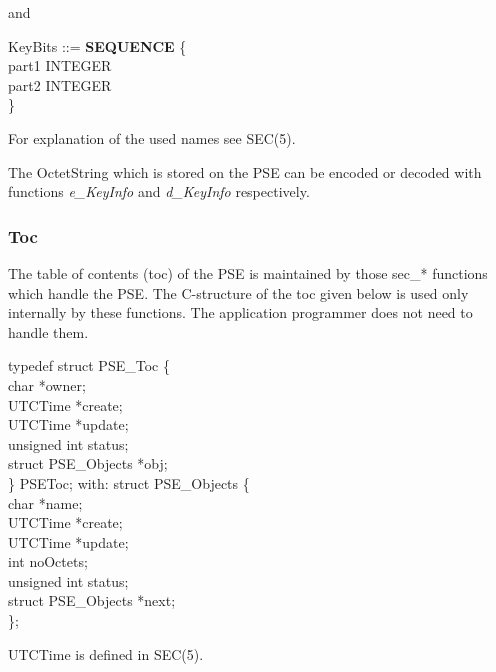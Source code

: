 and

{\small
\bvtab
\1 KeyBits ::= \3 {\bf SEQUENCE} \{ \\
\5                 part1 \2  INTEGER    \\
\5                 part2 \2  INTEGER \\
\4 \}
\evtab
}


For explanation of the used names see SEC(5). 

The OctetString which is stored on the PSE can be encoded or decoded with functions
{\em e\_KeyInfo} and {\em d\_KeyInfo} respectively.

\subsubsection{Toc}
The table of contents (toc) of the PSE is maintained by those sec\_* functions which 
handle the PSE. The C-structure of the toc given below is used only internally by these
functions. The application programmer does not need to handle them.

{\small
\bvtab
\4      typedef struct PSE\_Toc \{ \\
\6              char                \4 *owner; \\
\6              UTCTime             \4 *create; \\
\6              UTCTime             \4 *update; \\
\6		unsigned int        \4  status; \\
\6              struct PSE\_Objects \4 *obj; \\
\4      \} PSEToc;
\evtab
}
with:
{\small
\bvtab
\4      struct PSE\_Objects \{ \\
\6              char                \4 *name; \\
\6              UTCTime             \4 *create; \\
\6              UTCTime             \4 *update; \\
\6	        int                 \4  noOctets; \\
\6	        unsigned int        \4  status; \\
\6              struct PSE\_Objects \4 *next; \\
\4      \};
\evtab
}

UTCTime is defined in SEC(5).
